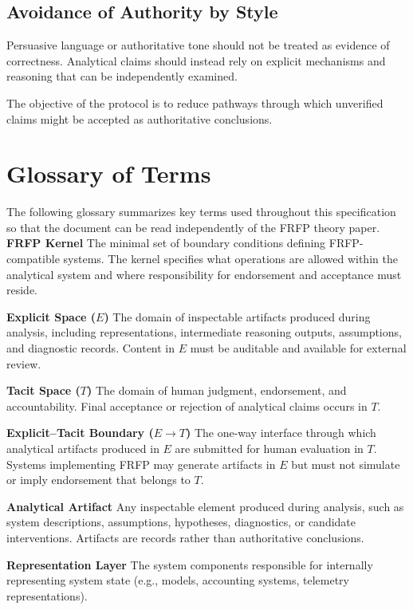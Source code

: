 \subsection{Avoidance of Authority by Style}

Persuasive language or authoritative tone should not be treated as
evidence of correctness. Analytical claims should instead rely on
explicit mechanisms and reasoning that can be independently examined.

The objective of the protocol is to reduce pathways through which
unverified claims might be accepted as authoritative conclusions.

\section{Glossary of Terms}
The following glossary summarizes key terms used throughout this
specification so that the document can be read independently of the
FRFP theory paper.
\textbf{FRFP Kernel}  
The minimal set of boundary conditions defining FRFP-compatible systems.
The kernel specifies what operations are allowed within the analytical system
and where responsibility for endorsement and acceptance must reside.

\textbf{Explicit Space ($E$)}  
The domain of inspectable artifacts produced during analysis, including
representations, intermediate reasoning outputs, assumptions, and diagnostic
records. Content in $E$ must be auditable and available for external review.

\textbf{Tacit Space ($T$)}  
The domain of human judgment, endorsement, and accountability.
Final acceptance or rejection of analytical claims occurs in $T$.

\textbf{Explicit–Tacit Boundary ($E \rightarrow T$)}  
The one-way interface through which analytical artifacts produced in $E$
are submitted for human evaluation in $T$. Systems implementing FRFP may
generate artifacts in $E$ but must not simulate or imply endorsement that
belongs to $T$.

\textbf{Analytical Artifact}  
Any inspectable element produced during analysis, such as system
descriptions, assumptions, hypotheses, diagnostics, or candidate
interventions. Artifacts are records rather than authoritative conclusions.

\textbf{Representation Layer}  
The system components responsible for internally representing system state
(e.g., models, accounting systems, telemetry representations).

